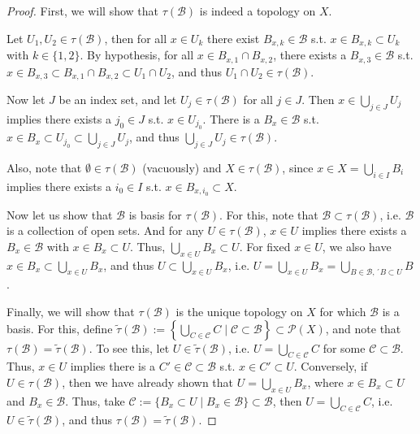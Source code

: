 \documentclass[12pt, a4paper]{article}
\numberwithin{equation}{section}
\theoremstyle{definition}
\theoremstyle{definition}
\begin{document}
		\begin{proof}
			First, we will show that $\tau(\mathscr B)$ is indeed a topology on $X$. 
			
			Let $U_1, U_2\in\tau(\mathscr B)$, then for all $x\in U_k$ there exist $B_{x, k}\in\mathscr B$ s.t. $x\in B_{x, k}\subset U_k$ with $k \in\{1, 2\}$. By hypothesis, for all $x\in B_{x, 1}\cap B_{x, 2}$, there exists a $B_{x, 3}\in\mathscr B$ s.t. $x\in B_{x, 3}\subset B_{x, 1}\cap B_{x, 2}\subset U_1\cap U_2$, and thus $U_1\cap U_2\in\tau(\mathscr B)$.
			
			Now let $J$ be an index set, and let $U_j\in \tau(\mathscr B)$ for all $j\in J$. Then $x\in \bigcup_{j\in J}U_j$ implies there exists a $j_0\in J$ s.t. $x\in U_{j_0}$. There is a $B_{x}\in\mathscr B$ s.t. $x\in B_x\subset U_{j_0} \subset \bigcup_{j\in J}U_j$, and thus $\bigcup_{j\in J}U_j\in \tau(\mathscr B)$.
			
			Also, note that $\emptyset\in\tau(\mathscr B)$ (vacuously) and $X\in \tau(\mathscr B)$, since $x\in X = \bigcup_{i\in I}B_i$ implies there exists a $i_0\in I$ s.t. $x\in B_{x, i_0}\subset X$.
			
			Now let us show that $\mathscr B$ is basis for $\tau(\mathscr B)$. For this, note that $\mathscr B\subset \tau(\mathscr B)$, i.e. $\mathscr B$ is a collection of open sets. And for any $U\in\tau(\mathscr B)$, $x\in U$ implies there exists a $B_{x}\in \mathscr B$ with $x\in B_x\subset U$. Thus, $\bigcup_{x\in U}B_x \subset U$. For fixed $x\in U$, we also have $x\in B_x\subset \bigcup_{x\in U}B_x$, and thus $U\subset \bigcup_{x\in U}B_x$, i.e. $U = \bigcup_{x\in U}B_x = \bigcup_{B\in\mathscr B, ´B\subset U}B$.
			
			Finally, we will show that $\tau(\mathscr B)$ is the unique topology on $X$ for which $\mathscr B$ is a basis. For this, define $\tilde{\tau}(\mathscr B) := \left\{ \bigcup_{C\in\mathscr C}C \mid \mathscr C\subset \mathscr B \right\}\subset \mathscr P(X)$, and note that $\tau(\mathscr B) = \tilde{\tau}(\mathscr B)$. To see this, let $U\in\tilde{\tau}(\mathscr B)$, i.e. $U = \bigcup_{C\in\mathscr C}C$ for some $\mathscr C\subset \mathscr B$. Thus, $x\in U$ implies there is a $C'\in\mathscr C\subset \mathscr B$ s.t. $x\in C'\subset U$. Conversely, if $U\in\tau(\mathscr B)$, then we have already shown that $U = \bigcup_{x\in U}B_x$, where $x\in B_x\subset U$ and $B_x\in\mathscr B$. Thus, take $\mathscr C := \{ B_x\subset U\mid B_x\in\mathscr B \} \subset \mathscr B$, then $U = \bigcup_{C\in\mathscr C}C$, i.e. $U\in\tilde{\tau}(\mathscr B)$, and thus $\tau(\mathscr B) = \tilde{\tau}(\mathscr B)$. 
			

\end{proof}
\end{document}
